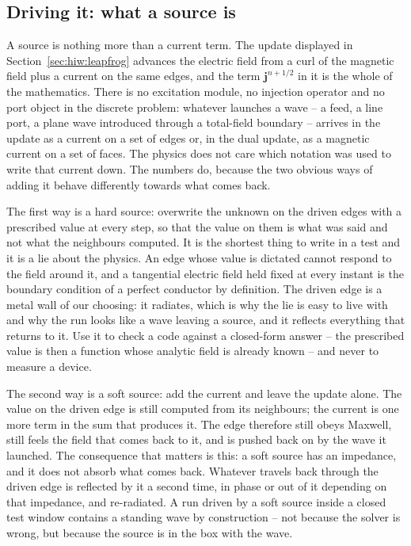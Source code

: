 \subsection{Driving it: what a source is}\label{sec:hiw:source}

A source is nothing more than a current term. The update displayed in Section~\ref{sec:hiw:leapfrog} advances
the electric field from a curl of the magnetic field plus a current on the same edges, and the term
$\mathbf{j}^{n+1/2}$ in it is the whole of the mathematics. There is no excitation module, no injection
operator and no port object in the discrete problem: whatever launches a wave -- a feed, a line port, a plane
wave introduced through a total-field boundary -- arrives in the update as a current on a set of edges or, in
the dual update, as a magnetic current on a set of faces. The physics does not care which notation was used to
write that current down. The numbers do, because the two obvious ways of adding it behave differently towards
what comes back.

The first way is a hard source: overwrite the unknown on the driven edges with a prescribed value at every
step, so that the value on them is what was said and not what the neighbours computed. It is the shortest thing
to write in a test and it is a lie about the physics. An edge whose value is dictated cannot respond to the
field around it, and a tangential electric field held fixed at every instant is the boundary condition of a
perfect conductor by definition. The driven edge is a metal wall of our choosing: it radiates, which is why the
lie is easy to live with and why the run looks like a wave leaving a source, and it reflects everything that
returns to it. Use it to check a code against a closed-form answer -- the prescribed value is then a function
whose analytic field is already known -- and never to measure a device.

The second way is a soft source: add the current and leave the update alone. The value on the driven edge is
still computed from its neighbours; the current is one more term in the sum that produces it. The edge
therefore still obeys Maxwell, still feels the field that comes back to it, and is pushed back on by the wave
it launched. The consequence that matters is this: a soft source has an impedance, and it does not absorb what
comes back. Whatever travels back through the driven edge is reflected by it a second time, in phase or out of
it depending on that impedance, and re-radiated. A run driven by a soft source inside a closed test window
contains a standing wave by construction -- not because the solver is wrong, but because the source is in the
box with the wave.

